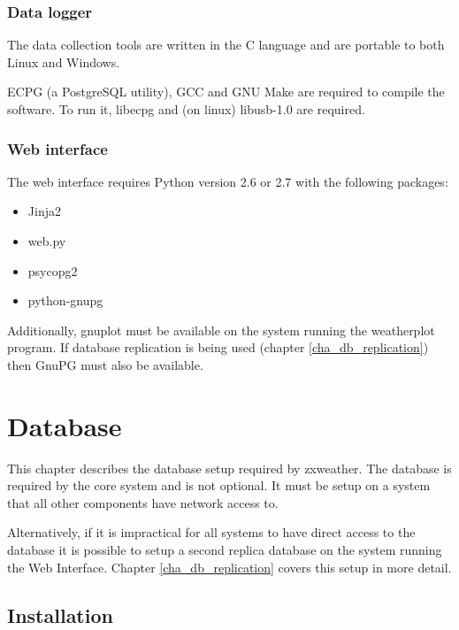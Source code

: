 \documentclass[a4paper,10pt,draft]{book}
\begin{document}
\subsection{Data logger}
The data collection tools are written in the C language and are portable to both Linux and Windows.

ECPG (a PostgreSQL utility), GCC and GNU Make are required to compile the software. To run it, libecpg and (on linux) libusb-1.0 are required.

\subsection{Web interface}
The web interface requires Python version 2.6 or 2.7 with the following packages:
\begin{itemize}
\item Jinja2
\item web.py
\item psycopg2
\item python-gnupg
\end{itemize}

Additionally, gnuplot must be available on the system running the weatherplot program. If database replication is being used (chapter \ref{cha_db_replication}) then GnuPG must also be available.

\chapter{Database}
\label{cha_database}

This chapter describes the database setup required by zxweather. The database is required by the core system and is not optional. It must be setup on a system that all other components have network access to.

Alternatively, if it is impractical for all systems to have direct access to the database it is possible to setup a second replica database on the system running the Web Interface. Chapter \ref{cha_db_replication} covers this setup in more detail.

\section{Installation}

\end{document}
